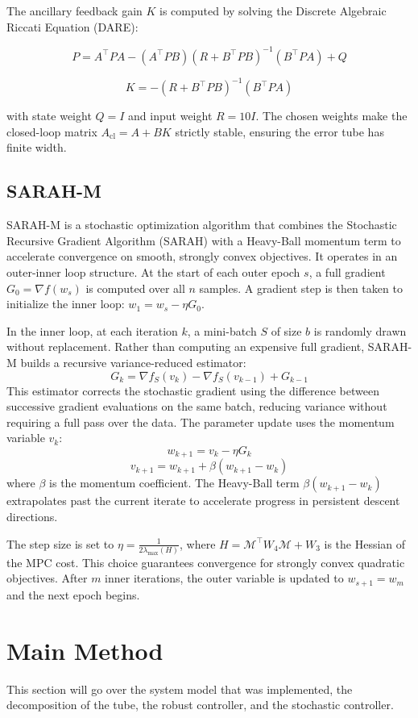 \documentclass[11pt]{article}
\begin{document}
The ancillary feedback gain $K$ is computed by solving the Discrete Algebraic Riccati Equation (DARE):

$$P = A^\top P A - (A^\top P B)(R + B^\top P B)^{-1}(B^\top P A) + Q$$

$$K = -(R + B^\top P B)^{-1}(B^\top P A)$$

with state weight $Q = I$ and input weight $R = 10I$. The chosen weights make the closed-loop matrix $A_{\text{cl}} = A + BK$ strictly stable, ensuring the error tube has finite width.

\subsection{SARAH-M}
SARAH-M \cite{YANG2024122295} is a stochastic optimization algorithm that combines the Stochastic Recursive Gradient Algorithm (SARAH) with a Heavy-Ball momentum term to accelerate convergence on smooth, strongly convex objectives. It operates in an outer-inner loop structure. At the start of each outer epoch $s$, a full gradient $G_0 = \nabla f(w_s)$ is computed over all $n$ samples. A gradient step is then taken to initialize the inner loop: $w_1 = w_s - \eta G_0$.

In the inner loop, at each iteration $k$, a mini-batch $S$ of size $b$ is randomly drawn without replacement. Rather than computing an expensive full gradient, SARAH-M builds a recursive variance-reduced estimator:
$$G_k = \nabla f_S(v_k) - \nabla f_S(v_{k-1}) + G_{k-1}$$
This estimator corrects the stochastic gradient using the difference between successive gradient evaluations on the same batch, reducing variance without requiring a full pass over the data. The parameter update uses the momentum variable $v_k$:
$$w_{k+1} = v_k - \eta G_k$$
$$v_{k+1} = w_{k+1} + \beta(w_{k+1} - w_k)$$
where $\beta$ is the momentum coefficient. The Heavy-Ball term $\beta(w_{k+1} - w_k)$ extrapolates past the current iterate to accelerate progress in persistent descent directions.

The step size is set to $\eta = \frac{1}{2\lambda_{\max}(H)}$, where $H = \mathcal{M}^\top W_4 \mathcal{M} + W_3$ is the Hessian of the MPC cost. This choice guarantees convergence for strongly convex quadratic objectives. After $m$ inner iterations, the outer variable is updated to $w_{s+1} = w_m$ and the next epoch begins.

\section{Main Method}
This section will go over the system model that was implemented, the decomposition of the tube, the robust controller, and the stochastic controller.
\end{document}
